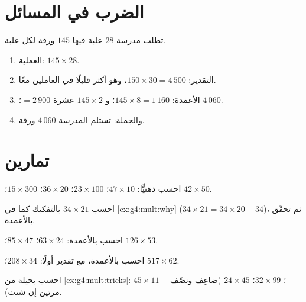 \section{الضرب في المسائل}

\begin{example}\label{ex:g4:mult:problem}
تطلب مدرسة $28$ علبة فيها $145$ ورقة لكل علبة.
\begin{enumerate}
  \item العملية: $145 \times 28$.
  \item التقدير: $150 \times 30 = 4\,500$، وهو أكثر قليلًا في
        العاملين معًا.
  \item الأعمدة: $145 \times 8 = 1\,160$؛ و $145 \times 2$ عشرة
        $= 2\,900$؛  $4\,060$.
  \item والجملة: تستلم المدرسة $4\,060$ ورقة.
\end{enumerate}
\end{example}

\section{تمارين}

\begin{exercise}[$\star$]\label{exo:g4:mult:1}
احسب ذهنيًّا: $47 \times 10$؛ \quad $23 \times 100$؛ \quad
$36 \times 20$؛ \quad $15 \times 300$؛ \quad $42 \times 50$.
\end{exercise}

\begin{exercise}[$\star$]\label{exo:g4:mult:2}
احسب $34 \times 21$ بالتفكيك كما في \cref{ex:g4:mult:why}
($34 \times 21 = 34 \times 20 + 34$)، ثم تحقّق بالأعمدة.
\end{exercise}

\begin{exercise}[$\star$]\label{exo:g4:mult:3}
احسب بالأعمدة: $63 \times 24$؛ \quad $85 \times 47$؛ \quad
$126 \times 53$.
\end{exercise}

\begin{exercise}[$\star$]\label{exo:g4:mult:4}
احسب بالأعمدة، مع تقدير أولًا: $208 \times 34$؛ \quad
$517 \times 62$.
\end{exercise}

\begin{exercise}[$\star$]\label{exo:g4:mult:5}
احسب بحيلة من \cref{ex:g4:mult:tricks}:
$45 \times 11$؛ \quad $32 \times 99$؛ \quad $24 \times 45$
(ضاعِف ونصِّف --- مرتين إن شئت).
\end{exercise}

